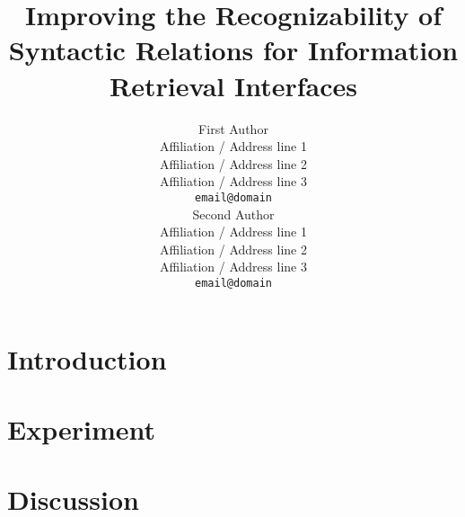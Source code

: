 \documentclass[11pt]{article}
\title{Improving the Recognizability of Syntactic Relations for Information Retrieval Interfaces}
\author{First Author \\
  Affiliation / Address line 1 \\
  Affiliation / Address line 2 \\
  Affiliation / Address line 3 \\
  {\tt email@domain} \\\And
  Second Author \\
  Affiliation / Address line 1 \\
  Affiliation / Address line 2 \\
  Affiliation / Address line 3 \\
  {\tt email@domain} \\}
\begin{document}
\maketitle

\begin{abstract}

\end{abstract}



\section{Introduction}


\section{Experiment}


\section{Discussion}




\end{document}
